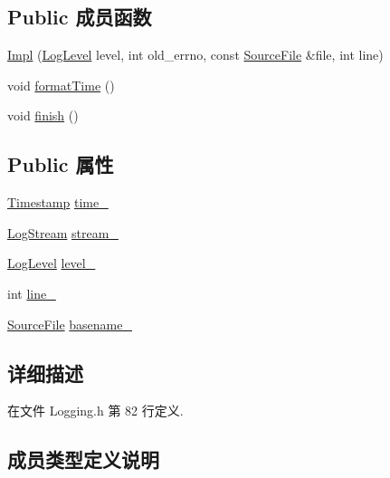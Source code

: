 \subsection*{Public 成员函数}
\begin{DoxyCompactItemize}
\item 
\hyperlink{classmuduo_1_1Logger_1_1Impl_a7c5ab4809227d6e7f68d59795830ac9e}{Impl} (\hyperlink{classmuduo_1_1Logger_aca1fd1d8935433e6ba2e3918214e07f9}{Log\+Level} level, int old\+\_\+errno, const \hyperlink{classmuduo_1_1Logger_1_1SourceFile}{Source\+File} \&file, int line)
\item 
void \hyperlink{classmuduo_1_1Logger_1_1Impl_a5994cb2c05631aaebfa5619e5f568233}{format\+Time} ()
\item 
void \hyperlink{classmuduo_1_1Logger_1_1Impl_a6dfe1abe0d1eb3ddc1ca081de98b5342}{finish} ()
\end{DoxyCompactItemize}
\subsection*{Public 属性}
\begin{DoxyCompactItemize}
\item 
\hyperlink{classmuduo_1_1Timestamp}{Timestamp} \hyperlink{classmuduo_1_1Logger_1_1Impl_a6ec326988c096c901eccb6c159d90623}{time\+\_\+}
\item 
\hyperlink{classmuduo_1_1LogStream}{Log\+Stream} \hyperlink{classmuduo_1_1Logger_1_1Impl_ad619d07eb80a509b28505be39cc07532}{stream\+\_\+}
\item 
\hyperlink{classmuduo_1_1Logger_aca1fd1d8935433e6ba2e3918214e07f9}{Log\+Level} \hyperlink{classmuduo_1_1Logger_1_1Impl_a1224b6f3dca58d9d78bc6441060e97c1}{level\+\_\+}
\item 
int \hyperlink{classmuduo_1_1Logger_1_1Impl_ac515e5f5602db49593f96316f1b5c054}{line\+\_\+}
\item 
\hyperlink{classmuduo_1_1Logger_1_1SourceFile}{Source\+File} \hyperlink{classmuduo_1_1Logger_1_1Impl_ab4b5f1514d523a2f00832b2294360a5e}{basename\+\_\+}
\end{DoxyCompactItemize}


\subsection{详细描述}


在文件 Logging.\+h 第 82 行定义.



\subsection{成员类型定义说明}
\mbox{\label{classmuduo_1_1Logger_1_1Impl_a562121cd8be97c8f9d8772d6b6a7c1cf}} 
